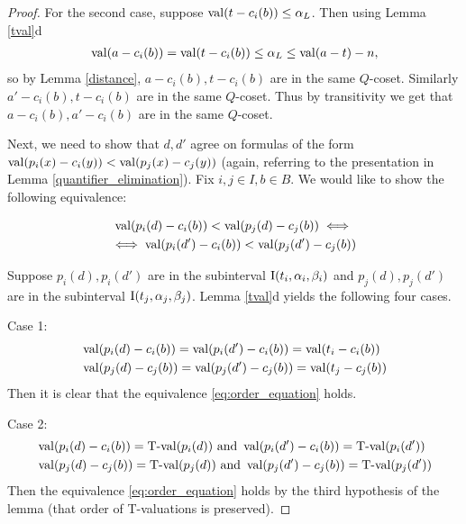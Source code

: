 \begin{proof}
  For the second case, suppose $\operatorname{val}(t - c_i(b)) \leq \alpha_L$.
  Then using Lemma \ref{tval}d
  \begin{align*}
    \operatorname{val}(a - c_i(b)) = \operatorname{val}(t - c_i(b)) \leq \alpha_L \leq \operatorname{val}(a - t) - n,
  \end{align*}
  so by Lemma \ref{distance}, $a - c_i(b), t - c_i(b)$ are in the same $Q$-coset.
  Similarly $a' - c_i(b), t - c_i(b)$ are in the same $Q$-coset.
  Thus by transitivity we get that $a - c_i(b), a' - c_i(b)$ are in the same $Q$-coset.

  Next, we need to show that $d, d'$ agree on formulas of the form
  $\operatorname{val} (p_i(x) - c_i(y)) < \operatorname{val} (p_j(x) - c_j(y))$ 
  (again, referring to the presentation in Lemma \ref{quantifier_elimination}).
  Fix $i,j \in I, b \in B$.
  We would like to show the following equivalence: 

  \begin{multline} \label {eq:order_equation}
    \operatorname{val} (p_i(d) - c_i(b)) < \operatorname{val} (p_j(d) - c_j(b)) \iff \\
    \iff \operatorname{val} (p_i(d') - c_i(b)) < \operatorname{val} (p_j(d') - c_j(b))
  \end{multline}

  Suppose $p_i(d), p_i(d')$ are in the subinterval $\operatorname{I}(t_i, \alpha_i, \beta_i)$ and 
  $p_j(d), p_j(d')$ are in the subinterval $\operatorname{I}(t_j, \alpha_j, \beta_j)$.
  Lemma \ref{tval}d yields the following four cases.

  Case 1:
  \begin{align*}
    &\operatorname{val} (p_i(d) - c_i(b)) = \operatorname{val} (p_i(d') - c_i(b)) = \operatorname{val}(t_i - c_i(b)) \\
    &\operatorname{val} (p_j(d) - c_j(b)) = \operatorname{val} (p_j(d') - c_j(b)) = \operatorname{val}(t_j - c_j(b))
  \end{align*}
  Then it is clear that the equivalence \eqref{eq:order_equation} holds.

  Case 2:
  \begin{align*}
    &\operatorname{val} (p_i(d) - c_i(b)) = \operatorname{T-val}(p_i(d)) \text{ and } \operatorname{val} (p_i(d') - c_i(b)) = \operatorname{T-val}(p_i(d')) \\
    &\operatorname{val} (p_j(d) - c_j(b)) = \operatorname{T-val}(p_j(d)) \text{ and } \operatorname{val} (p_j(d') - c_j(b)) = \operatorname{T-val}(p_j(d'))
  \end{align*}
  Then the equivalence \eqref{eq:order_equation} holds by the third hypothesis of the lemma (that order of T-valuations is preserved).


\end{proof}
